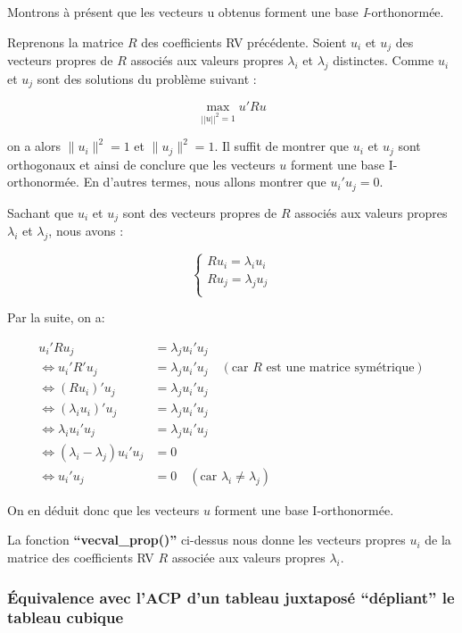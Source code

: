 \documentclass[
]{article}
\begin{document}
Montrons à présent que les vecteurs u obtenus forment une base
\emph{I}-orthonormée.

Reprenons la matrice \(R\) des coefficients RV précédente. Soient
\(u_i\) et \(u_j\) des vecteurs propres de \(R\) associés aux valeurs
propres \(\lambda_i\) et \(\lambda_j\) distinctes. Comme \(u_i\) et
\(u_j\) sont des solutions du problème suivant :

\[
\max_{\left|\left| u \right|\right|^2 = 1} u'R u
\]

on a alors \(\|u_i\|^2 = 1\) et \(\|u_j\|^2 = 1\). Il suffit de montrer
que \(u_i\) et \(u_j\) sont orthogonaux et ainsi de conclure que les
vecteurs \(u\) forment une base I-orthonormée. En d'autres termes, nous
allons montrer que \(u_i'u_j = 0\).

Sachant que \(u_i\) et \(u_j\) sont des vecteurs propres de \(R\)
associés aux valeurs propres \(\lambda_i\) et \(\lambda_j\), nous avons
:

\[
\begin{cases}
  Ru_i  = \lambda_i u_i \\
  Ru_j  = \lambda_j u_j \\
\end{cases}
\]

Par la suite, on a:

\begin{align*}
u_i'Ru_j &= \lambda_j u_i' u_j\\
\iff u_i'R'u_j &= \lambda_j u_i' u_j \quad (\text{car } R \text{ est une matrice symétrique})\\
\iff (Ru_i)'u_j &= \lambda_j u_i' u_j\\
\iff (\lambda_i u_i)'u_j &= \lambda_j u_i' u_j\\
\iff \lambda_i u_i'u_j &= \lambda_j u_i' u_j\\
\iff (\lambda_i - \lambda_j) u_i'u_j &=  0\\
\iff u_i'u_j &=  0 \quad (\text{car } \lambda_i \neq \lambda_j)
\end{align*}

On en déduit donc que les vecteurs \(u\) forment une base I-orthonormée.

La fonction \textbf{``vecval\_prop()''} ci-dessus nous donne les
vecteurs propres \(u_i\) de la matrice des coefficients RV \(R\)
associée aux valeurs propres \(\lambda_i\).

\hypertarget{uxe9quivalence-avec-lacp-dun-tableau-juxtaposuxe9-duxe9pliant-le-tableau-cubique}{%
\subsubsection{Équivalence avec l'ACP d'un tableau juxtaposé
``dépliant'' le tableau
cubique}\label{uxe9quivalence-avec-lacp-dun-tableau-juxtaposuxe9-duxe9pliant-le-tableau-cubique}}
\end{document}
